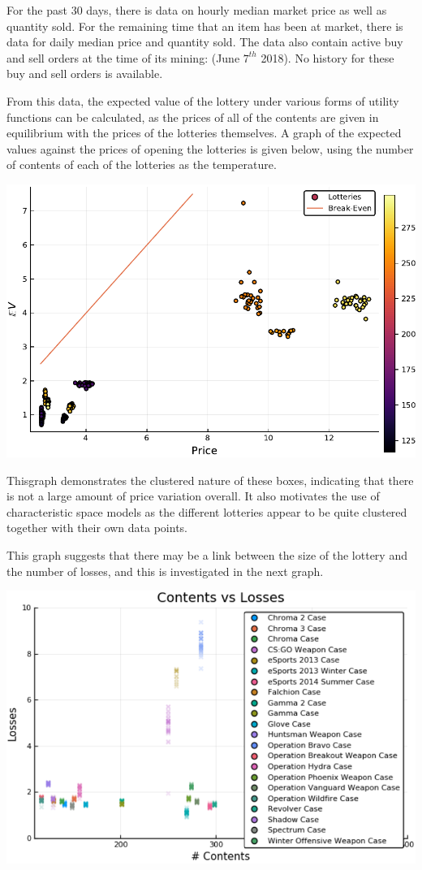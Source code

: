 \documentclass[12pt]{paper}
\begin{document}
For the past 30 days, there is data on hourly median market price as
well as quantity sold. For the remaining time that an item has been at
market, there is data for daily median price and quantity sold. The
data also contain active buy and sell orders at the time of its
mining: (June $7^{th}$ 2018). No history for these buy and sell orders
is available.

From this data, the expected value of the lottery under various forms
of utility functions can be calculated, as the prices of all of the
contents are given in equilibrium with the prices of the lotteries
themselves. A graph of the expected values against the prices of
opening the lotteries is given below, using the number of contents of
each of the lotteries as the temperature.

\begin{center}
\includegraphics[width=.9\linewidth]{../Plots/BreakEvenScatter.pdf}
\end{center}

Thisgraph demonstrates the clustered nature of these boxes, indicating
that there is not a large amount of price variation overall. It also
motivates the use of characteristic space models as the different
lotteries appear to be quite clustered together with their own data
points.


This graph suggests that there may be a link between the size of the
lottery and the number of losses, and this is investigated in the next
graph.

\begin{center}
\includegraphics[width=.9\linewidth]{../Plots/LossesVSize.pdf}
\end{center}
\end{document}
